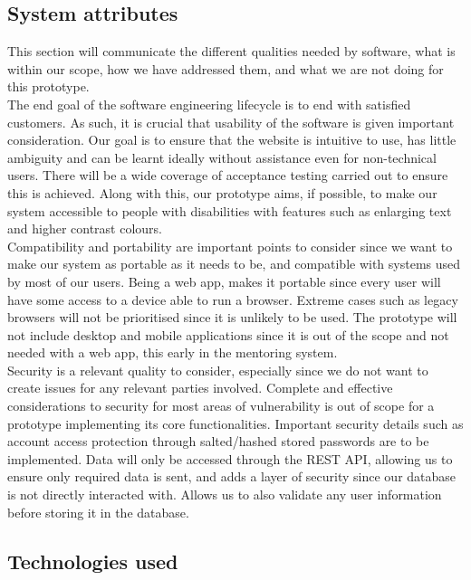 \documentclass[10pt]{article}
\begin{document}
\subsection{System attributes}
This section will communicate the different qualities needed by software, what
is within our scope, how we have addressed them, and what we are not doing for
this prototype.\\ The end goal of the software engineering lifecycle is to end
with satisfied customers. As such, it is crucial that usability of the software
is given important consideration. Our goal is to ensure that the website is
intuitive to use, has little ambiguity and can be learnt ideally without
assistance even for non-technical users. There will be a wide coverage of
acceptance testing carried out to ensure this is achieved. Along with this, our
prototype aims, if possible, to make our system accessible to people with
disabilities with features such as enlarging text and higher contrast colours.
\\Compatibility and portability are important points to consider since we want to
make our system as portable as it needs to be, and compatible with systems used
by most of our users. Being a web app, makes it portable since every user will
have some access to a device able to run a browser. Extreme cases such as legacy
browsers will not be prioritised since it is unlikely to be used. The prototype
will not include desktop and mobile applications since it is out of the scope
and not needed with a web app, this early in the mentoring system. \\Security is a
relevant quality to consider, especially since we do not want to create issues
for any relevant parties involved. Complete and effective considerations to
security for most areas of vulnerability is out of scope for a prototype
implementing its core functionalities. Important security details such as
account access protection through salted/hashed stored passwords are to be
implemented. Data will only be accessed through the REST API, allowing us to
ensure only required data is sent, and adds a layer of security since our
database is not directly interacted with. Allows us to also validate any user
information before storing it in the database.

\subsection{Technologies used}
\end{document}
